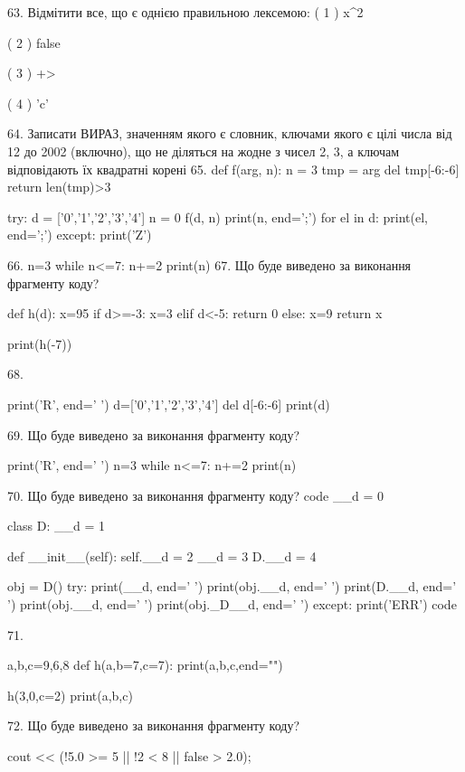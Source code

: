 \documentclass[11pt]{article}
\begin{document}
{%
63. %
Відмітити все, що є однією правильною лексемою:
( 1 ) x^2

( 2 ) false

( 3 ) +>

( 4 ) 'c'

64. 
Записати ВИРАЗ, значенням якого є словник, ключами якого є цілі числа від 12 до 2002 (включно), що не діляться на жодне з чисел 2, 3, а ключам відповідають їх квадратні корені 
65. 
def f(arg, n):
    n = 3
    tmp = arg
    del tmp[-6:-6]
    return len(tmp)>3

try:
    d = ['0','1','2','3','4']
    n = 0
    f(d, n)
    print(n, end=';')
    for el in d:
        print(el, end=';')
except:
    print('Z')

66. 
n=3
   while n<=7: n+=2
   print(n)
67. Що буде виведено за виконання фрагменту коду?

def h(d):
    x=95
    if d>=-3: 
        x=3
    elif d<-5:
         return 0
    else:
         x=9
    return x

print(h(-7))

68. 

print('R', end=' ')
d=['0','1','2','3','4']
del d[-6:-6]
print(d)


69. Що буде виведено за виконання фрагменту коду?

print('R', end=' ')
n=3
while n<=7:
    n+=2
print(n)


70. Що буде виведено за виконання фрагменту коду?
code
__d = 0

class D:
    __d = 1
    
    def __init__(self):
        self.__d = 2
        __d = 3
        D.__d = 4

obj = D()
try:
    print(__d, end=' ')
    print(obj.__d, end=' ')
    print(D.__d, end=' ')
    print(obj.__d, end=' ')
    print(obj._D__d, end=' ')
except:
    print('ERR')
code

71. 

a,b,c=9,6,8
def h(a,b=7,c=7):
    print(a,b,c,end="")

h(3,0,c=2)
print(a,b,c)


72. Що буде виведено за виконання фрагменту коду?

cout << (!5.0 >= 5 || !2 < 8 || false > 2.0);

}
\end{document}
